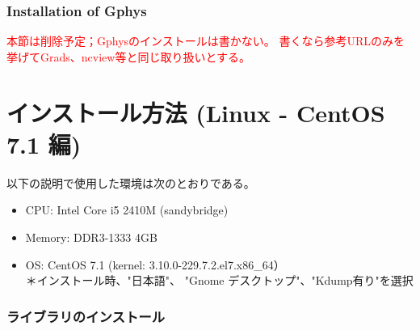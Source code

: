 \subsubsection{Installation of Gphys}

\textcolor{red}{\large 本節は削除予定；Gphysのインストールは書かない。
書くなら参考URLのみを挙げてGrads、ncview等と同じ取り扱いとする。}





\section{インストール方法 (Linux - CentOS 7.1 編)}

以下の説明で使用した環境は次のとおりである。
\begin{itemize}
\item CPU: Intel Core i5 2410M (sandybridge)
\item Memory: DDR3-1333 4GB
\item OS: CentOS 7.1 (kernel: 3.10.0-229.7.2.el7.x86\_64）\\
{\small ＊インストール時、"日本語"、 "Gnome デスクトップ"、"Kdump有り"を選択}
\end{itemize}

\subsubsection{ライブラリのインストール}

